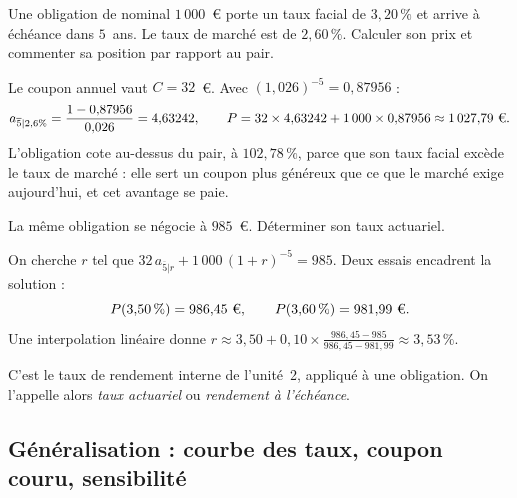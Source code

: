 \begin{exercice}
Une obligation de nominal $1\,000$~\euro{} porte un taux facial de $3{,}20\,\%$
et arrive à échéance dans $5$~ans. Le taux de marché est de $2{,}60\,\%$.
Calculer son prix et commenter sa position par rapport au pair.
\end{exercice}

\begin{corrige}
Le coupon annuel vaut $C = 32$~\euro. Avec $(1{,}026)^{-5} = 0{,}87956$ :
\[
  a_{\overline{5}|2{,}6\%} = \frac{1-0{,}87956}{0{,}026} = 4{,}63242,
  \qquad
  P = 32 \times 4{,}63242 + 1\,000 \times 0{,}87956 \approx 1\,027{,}79\ \text{\euro}.
\]
L'obligation cote au-dessus du pair, à $102{,}78\,\%$, parce que son taux facial
excède le taux de marché : elle sert un coupon plus généreux que ce que le
marché exige aujourd'hui, et cet avantage se paie.
\end{corrige}

\begin{exercice}
La même obligation se négocie à $985$~\euro. Déterminer son taux actuariel.
\end{exercice}

\begin{corrige}
On cherche $r$ tel que $32\,a_{\overline{5}|r} + 1\,000\,(1+r)^{-5} = 985$.
Deux essais encadrent la solution :
\[
  P(3{,}50\,\%) = 986{,}45\ \text{\euro},
  \qquad
  P(3{,}60\,\%) = 981{,}99\ \text{\euro}.
\]
Une interpolation linéaire donne
$r \approx 3{,}50 + 0{,}10 \times \tfrac{986{,}45-985}{986{,}45-981{,}99}
 \approx 3{,}53\,\%$.

C'est le taux de rendement interne de l'unité~2, appliqué à une obligation. On
l'appelle alors \emph{taux actuariel} ou \emph{rendement à l'échéance}.
\end{corrige}

\subsection{Généralisation : courbe des taux, coupon couru, sensibilité}

